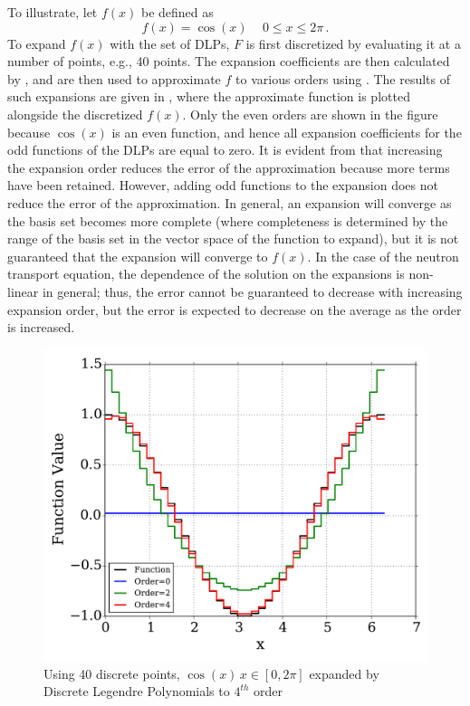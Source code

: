 To illustrate, let $f(x)$ be defined as
\begin{equation}
    f(x) = \cos(x) \, \quad 0\leq x \leq 2\pi\, .
\end{equation}
To expand $f(x)$ with the set of DLPs, $F$ is first discretized by 
evaluating it 
at a number of points, e.g., 40 points.  The expansion coefficients are 
then calculated by , and are then used to approximate 
$f$ to various orders using .  The results of such expansions 
are given in , where the approximate function is 
plotted alongside the discretized $f(x)$.  Only the even orders are 
shown in the figure because $\cos(x)$ is an even function, and hence all 
expansion coefficients for the odd functions of the DLPs are equal to zero. It 
is evident from  that increasing the expansion order 
reduces the error of the approximation because more terms have been retained. 
However, adding odd functions to the expansion does not reduce the error of the 
approximation.  
In general, an expansion will converge as the basis set becomes more 
complete (where completeness is determined by the range of the basis set in 
the vector space of the function to expand), but it is not guaranteed that 
the expansion will converge to $f(x)$.  In the case of 
the neutron transport equation, the dependence of the solution on the expansions 
is non-linear in general; thus, the error cannot be 
guaranteed to decrease with increasing expansion order, but the error is 
expected to decrease on the average as the order is increased.

\begin{figure}[bt]
    \centering
    \includegraphics[trim=.1cm .25cm .1cm .4cm, clip=true,
    totalheight=0.35\textheight]{Figures/expansion}
    \caption{Using 40 discrete points, $\cos(x)\,  x\in[0,2\pi]$ expanded by 
Discrete Legendre Polynomials to $4^{th}$ order}
    \label{fig:DLPexpansion}
\end{figure}

